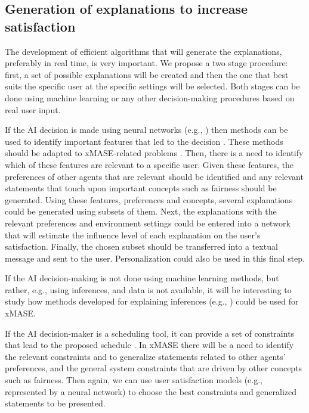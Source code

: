 \documentclass[letterpaper]{article} %
\begin{document}
{{{{{{{{{\subsection{Generation of explanations to increase satisfaction}
The development of efficient algorithms that will generate the explanations, preferably in real time, is very important.
We propose a two stage procedure: first, a set of possible explanations will be created and then the one that best suits the specific user at the specific settings will be selected. Both stages can be done using machine learning or any other decision-making procedures based on real user input.

If the AI decision is made using neural networks (e.g., \cite{rosemarin2019emergency,li2019efficient}) then methods can be used to identify important features that led to the decision
\cite{Shrikumar17,Bach15}. These methods should be adapted to \ac{xMASE}-related problems \cite{Lee19,Selvaraju17}.
Then, there is a need to identify which of these features are relevant to a specific user. Given these features, the preferences of other agents that are relevant should be identified and any relevant statements that touch upon important concepts such as  fairness should be generated.
Using these features, preferences and concepts, several explanations could be generated using subsets of them. Next, the explanations with the relevant preferences and environment settings could be entered into a network that will estimate the influence level of each explanation on the user's satisfaction. Finally, the chosen subset should be transferred into a textual message and sent to the user. Personalization could also be used in this final step.

If the AI decision-making is not done using machine learning methods, but rather, e.g., using inferences, and data is not available, it will be interesting to study how methods developed for explaining inferences (e.g.,  \cite{pino2003preferences}) could be used for \ac{xMASE}.

If the AI decision-maker is a scheduling tool, it can provide a set of constraints that lead to the proposed schedule \cite{ludwig2018explaining}. In \ac{xMASE} there will be a need to identify the relevant constraints and to generalize  statements related to other agents' preferences, and the general system constraints that are driven by other concepts such as fairness. Then again, we can use user satisfaction models (e.g., represented by a neural network) to choose the best constraints and generalized statements to be presented.

}}}}}}}}}
\end{document}
